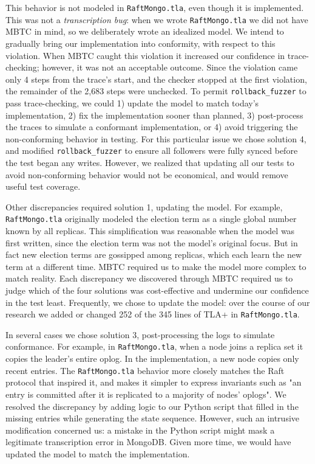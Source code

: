 \documentclass{vldb}
\begin{document}
This behavior is not modeled in \texttt{RaftMongo.tla}, even though it is implemented.
This was not a \textit{transcription bug}: when we wrote \texttt{RaftMongo.tla} we did not have MBTC in mind, so we deliberately wrote an idealized model. 
We intend to gradually bring our implementation into conformity, with respect to this violation.
When MBTC caught this violation it increased our confidence in trace-checking; however, it was not an acceptable outcome. 
Since the violation came only 4 steps from the trace's start, and the checker stopped at the first violation, the remainder of the 2,683 steps were unchecked. 
To permit \texttt{rollback\_fuzzer} to pass trace-checking, we could 1) update the model to match today's implementation, 2) fix the implementation sooner than planned, 3) post-process the traces to simulate a conformant implementation, or 4) avoid triggering the non-conforming behavior in testing. 
For this particular issue we chose solution 4, and modified \texttt{rollback\_fuzzer} to ensure all followers were fully synced before the test began any writes. 
However, we realized that updating all our tests to avoid non-conforming behavior would not be economical, and would remove useful test coverage.

Other discrepancies required solution 1, updating the model. 
For example, \texttt{RaftMongo.tla} originally modeled the election term as a single global number known by all replicas.
This simplification was reasonable when the model was first written, since the election term was not the model's original focus. 
But in fact new election terms are gossipped among replicas, which each learn the new term at a different time.
MBTC required us to make the model more complex to match reality. 
Each discrepancy we discovered through MBTC required us to judge which of the four solutions was cost-effective and undermine our confidence in the test least.
Frequently, we chose to update the model: over the course of our research we added or changed 252 of the 345 lines of TLA+ in \texttt{RaftMongo.tla}.

In several cases we chose solution 3, post-processing the logs to simulate conformance. For example, in \texttt{RaftMongo.tla}, when a node joins a replica set it copies the leader's entire oplog. In the implementation, a new node copies only recent entries. The \texttt{RaftMongo.tla} behavior more closely matches the Raft protocol that inspired it, and makes it simpler to express invariants such as "an entry is committed after it is replicated to a majority of nodes' oplogs". We resolved the discrepancy by adding logic to our Python script that filled in the missing entries while generating the state sequence. However, such an intrusive modification concerned us: a mistake in the Python script might mask a legitimate transcription error in MongoDB. Given more time, we would have updated the model to match the implementation.
\end{document}
